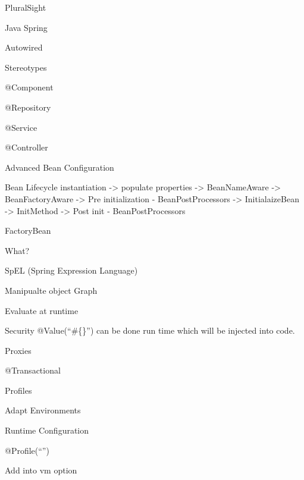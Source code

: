 \documentclass[presentation]{beamer}
\begin{document}
\begin{frame}[label={sec:org34d6546}]{PluralSight}
\begin{block}{Java Spring}
\begin{block}{Autowired}
\end{block}
\begin{block}{Stereotypes}
\begin{block}{@Component}
\end{block}
\begin{block}{@Repository}
\end{block}
\begin{block}{@Service}
\end{block}
\begin{block}{@Controller}
\end{block}
\end{block}
\begin{block}{Advanced Bean Configuration}
\begin{block}{Bean Lifecycle}
instantiation -> populate properties -> BeanNameAware -> BeanFactoryAware -> Pre initialization - BeanPostProcessors -> InitialaizeBean -> InitMethod -> Post init - BeanPostProcessors
\end{block}
\begin{block}{FactoryBean}
\begin{block}{What?}
\end{block}
\end{block}
\begin{block}{SpEL (Spring Expression Language)}
\begin{block}{Manipualte object Graph}
\end{block}
\begin{block}{Evaluate at runtime}
\end{block}
\begin{block}{Security}
@Value(``\#\{\}'') can be done run time which will be injected into code.
\end{block}
\end{block}
\begin{block}{Proxies}
\begin{block}{@Transactional}
\end{block}
\end{block}
\begin{block}{Profiles}
\begin{block}{Adapt Environments}
\end{block}
\begin{block}{Runtime Configuration}
\end{block}
\begin{block}{@Profile(``'')}
\end{block}
\begin{block}{Add into vm option}

\end{block}
\end{block}
\end{block}
\end{block}
\end{frame}
\end{document}
